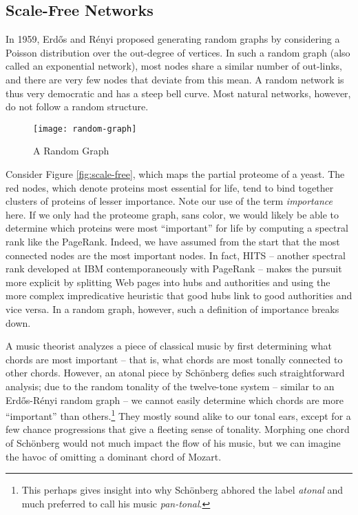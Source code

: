 \documentclass[../exploring-pagerank.tex]{subfiles}
\begin{document}
    \subsection{Scale-Free Networks}
    In 1959, Erdős and Rényi proposed generating random graphs by considering a Poisson distribution over the out-degree of vertices. In such a random graph (also called an exponential network), most nodes share a similar number of out-links, and there are very few nodes that deviate from this mean. A random network is thus very democratic and has a steep bell curve. Most natural networks, however, do not follow a random structure. 
    \begin{figure}
        \centering
        \texttt{[image: random-graph]}
        \caption{A Random Graph \cite{RandomGeometricGraph}}
        \label{fig:random}
    \end{figure}
    Consider Figure \ref{fig:scale-free}, which maps the partial proteome of a yeast. The red nodes, which denote proteins most essential for life, tend to bind together clusters of proteins of lesser importance. Note our use of the term \textit{importance} here. If we only had the proteome graph, sans color, we would likely be able to determine which proteins were most ``important'' for life by computing a spectral rank like the PageRank. Indeed, we have assumed from the start that the most connected nodes are the most important nodes. In fact, HITS -- another spectral rank developed at IBM contemporaneously with PageRank -- makes the pursuit  more explicit by splitting Web pages into hubs and authorities and using the more complex impredicative heuristic that good hubs link to good authorities and vice versa. In a random graph, however, such a definition of importance breaks down.
    
    A music theorist analyzes a piece of classical music by first determining what chords are most important -- that is, what chords are most tonally connected to other chords. However, an atonal piece by Schönberg defies such straightforward analysis; due to the random tonality of the twelve-tone system -- similar to an Erdős-Rényi random graph -- we cannot easily determine which chords are more ``important'' than others.\footnote{This perhaps gives insight into why Schönberg abhored the label \textit{atonal} and much preferred to call his music \textit{pan-tonal}.} They mostly sound alike to our tonal ears, except for a few chance progressions that give a fleeting sense of tonality. Morphing one chord of Schönberg would not much impact the flow of his music, but we can imagine the havoc of omitting a dominant chord of Mozart.
    
\end{document}
